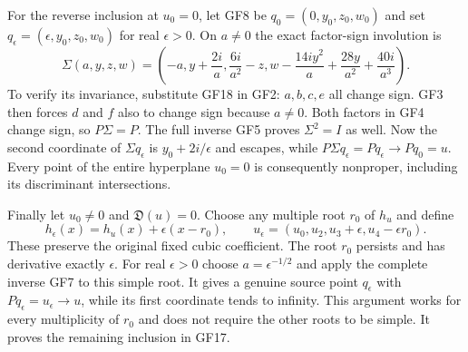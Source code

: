 For the reverse inclusion at $u_0=0$, let GF8 be
$q_0=(0,y_0,z_0,w_0)$ and set
$q_\epsilon=(\epsilon,y_0,z_0,w_0)$ for real $\epsilon>0$.
On $a\ne0$ the exact factor-sign involution is
\begin{equation}
 \Sigma(a,y,z,w)=\left(-a,y+\frac{2i}{a},\frac{6i}{a^2}-z,
 w-\frac{14iy^2}{a}+\frac{28y}{a^2}+\frac{40i}{a^3}\right).
 \tag{GF18}
\end{equation}
To verify its invariance, substitute GF18 in GF2: $a,b,c,e$
all change sign. GF3 then forces $d$ and $f$ also to change sign
because $a\ne0$. Both factors in GF4 change sign, so
$P\Sigma=P$. The full inverse GF5 proves $\Sigma^2=I$ as well.
Now the second coordinate of $\Sigma q_\epsilon$ is
$y_0+2i/\epsilon$ and escapes, while
$P\Sigma q_\epsilon=Pq_\epsilon\to Pq_0=u$.
Every point of the entire hyperplane $u_0=0$ is consequently
nonproper, including its discriminant intersections.

Finally let $u_0\ne0$ and $\mathfrak D(u)=0$. Choose any multiple
root $r_0$ of $h_u$ and define
\[
 h_\epsilon(x)=h_u(x)+\epsilon(x-r_0),\qquad
 u_\epsilon=(u_0,u_2,u_3+\epsilon,u_4-\epsilon r_0).
\]
These preserve the original fixed cubic coefficient.
The root $r_0$ persists and has derivative exactly $\epsilon$.
For real $\epsilon>0$ choose $a=\epsilon^{-1/2}$ and apply the
complete inverse GF7 to this simple root. It gives a genuine
source point $q_\epsilon$ with $Pq_\epsilon=u_\epsilon\to u$,
while its first coordinate tends to infinity. This argument works
for every multiplicity of $r_0$ and does not require the other roots
to be simple. It proves the remaining inclusion in GF17.

